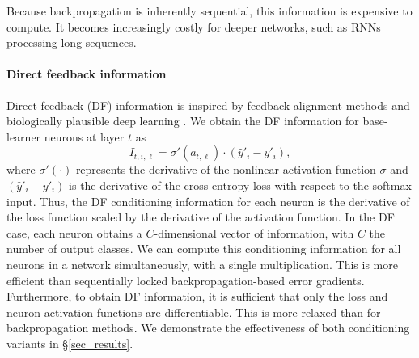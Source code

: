 \documentclass{article}
\begin{document}
Because backpropagation is inherently sequential, this information is expensive to compute. It becomes increasingly costly for deeper networks, such as RNNs processing long sequences.

\paragraph{Direct feedback information}
Direct feedback (DF) information is inspired by feedback alignment methods \cite{lillicrap2016random,nokland2016direct} and biologically plausible deep learning \cite{bengio2015towards}. We obtain the DF information for base-learner neurons at layer $t$ as
\begin{equation}
\label{meta_df}
I_{t,i,\ell} =  \sigma'(a_{t,\ell}) \cdot (\hat{y}'_i - y'_i),
\end{equation}
where  $\sigma'(\cdot)$ represents the derivative of the nonlinear activation function $\sigma$ and $(\hat{y}'_i - y'_i)$ is the derivative of the cross entropy loss with respect to the softmax input. Thus, the DF conditioning information for each neuron is the derivative of the loss function scaled by the derivative of the activation function.
In the DF case, each neuron obtains a $C$-dimensional vector of information, with $C$ the number of output classes.
We can compute this conditioning information for all neurons in a network simultaneously, with a single multiplication. This is more efficient than sequentially locked backpropagation-based error gradients. Furthermore, to obtain DF information, it is sufficient that only the loss and neuron activation functions are differentiable. This is more relaxed than for backpropagation methods. We demonstrate the effectiveness of both conditioning variants in \S\ref{sec_results}.
\end{document}

